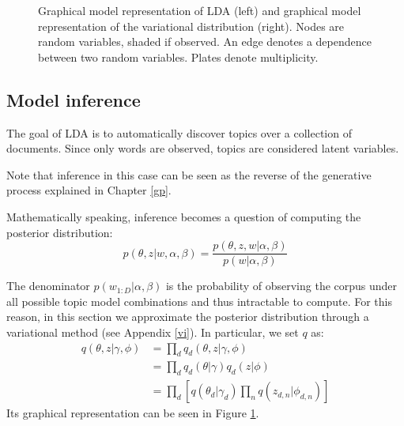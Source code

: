 \begin{figure}[h]
    \centering
    \caption{Graphical model representation of LDA (left) and graphical model representation of the variational distribution (right). Nodes are random variables, shaded if observed. An edge denotes a dependence between two random variables. Plates denote multiplicity.}
    \label{fig:lda}
\end{figure}

\subsection{Model inference}
The goal of LDA is to automatically discover topics over a collection of documents.
Since only words are observed, topics are considered latent variables.

Note that inference in this case can be seen as the reverse of the generative process explained in Chapter \ref{gp}.

Mathematically speaking, inference becomes a question of computing the posterior distribution:
$$ p(\theta, z | w, \alpha, \beta) = \frac{p(\theta, z, w | \alpha, \beta)}{p(w| \alpha, \beta)}$$

The denominator $p(w_{1:D} | \alpha, \beta)$ is the probability of observing the corpus under all possible topic model combinations
and thus intractable to compute.
For this reason, in this section we approximate the posterior distribution through a variational method
(see Appendix \ref{vi}).
In particular, we set $q$ as:
\begin{equation*}
    \begin{split}
        q(\theta, z | \gamma, \phi) & = \prod_d q_d(\theta, z | \gamma, \phi) \\
        & = \prod_d q_d(\theta | \gamma) q_d(z | \phi) \\
        & = \prod_d [q(\theta_d | \gamma_d) \prod_n q(z_{d,n} | \phi_{d,n})]
    \end{split}
\end{equation*}
Its graphical representation can be seen in Figure \ref{fig:lda}.

